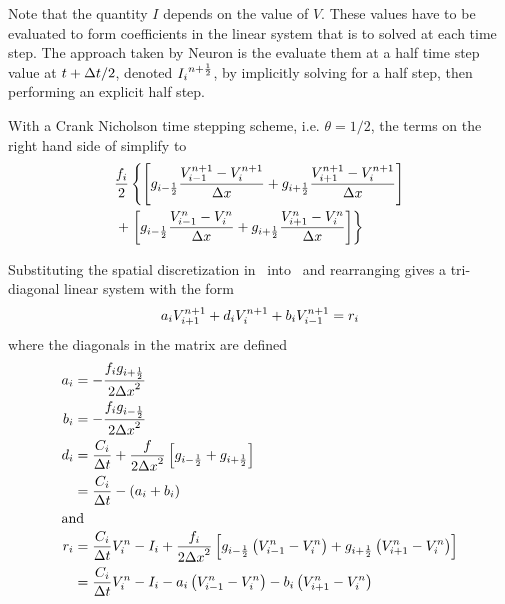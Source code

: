 Note that the quantity $I$ depends on the value of $V$. These values have to be evaluated to form coefficients in the linear system that is to solved at each time step. The approach taken by Neuron is the evaluate them at a half time step value at $t+{\Delta t}/2$, denoted ${{I}_{i}}^{n+\frac{1}{2}}$, by implicitly solving for a half step, then performing an explicit half step.

With a Crank Nicholson time stepping scheme, i.e. $\theta=1/2$, the terms on the right hand side of  simplify to
\begin{align}
        \frac{{f}_{i}}{2}
        &\left\{
            \left[
                {g}_{i-\frac{1}{2}} \frac{{V}_{i-1}^{n+1}-{V}_{i}^{n+1}}{{\Delta x}}
              + {g}_{i+\frac{1}{2}}  \frac{{V}_{i+1}^{n+1}-{V}_{i}^{n+1}}{{\Delta x}}
            \right]
        \right. \nonumber \\
        +
        &\left.
            \left[
                {g}_{i-\frac{1}{2}} \frac{{V}_{i-1}^{n}-{V}_{i}^{n}}{{\Delta x}}
              + {g}_{i+\frac{1}{2}}  \frac{{V}_{i+1}^{n}-{V}_{i}^{n}}{{\Delta x}}
            \right]
        \right\} \label{eq:crankNichRHS}
\end{align}

Substituting the spatial discretization in~ into~ and rearranging gives a tri-diagonal linear system with the form
\begin{equation}
    {a}_{i} {V}_{i+1}^{n+1} + {d}_{i} {V}_{i}^{n+1} + {b}_{i} {V}_{i-1}^{n+1} = {r}_{i}
\end{equation}
where the diagonals in the matrix are defined
\begin{align}
    {a}_{i}  &=  -\frac{{f}_{i}{g}_{i+\frac{1}{2}}}{2{\Delta x}^2} \\
    {b}_{i}  &=  -\frac{{f}_{i}{g}_{i-\frac{1}{2}}}{2{\Delta x}^2} \\
    {d}_{i}  &=  \frac{{C}_{i}}{{\Delta t}} + \frac{f}{2{\Delta x}^2}\left[{g}_{i-\frac{1}{2}}+{g}_{i+\frac{1}{2}}\right] \nonumber\\
            &=  \frac{{C}_{i}}{{\Delta t}} - ( {a}_{i} + {b}_{i} ) \\
\intertext{and}
    {r}_{i}  &=  \frac{{C}_{i}}{{\Delta t}} {V}_{i}^n - {I}_{i} + \frac{{f}_{i}}{2{\Delta x}^2}
                    \left[
                        {g}_{i-\frac{1}{2}} \left( {V}_{i-1}^{n} - {V}_{i}^{n} \right)
                        +
                        {g}_{i+\frac{1}{2}}  \left( {V}_{i+1}^{n}  - {V}_{i}^{n} \right)
                    \right] \nonumber\\
            &=  \frac{{C}_{i}}{{\Delta t}} {V}_{i}^n
                - {I}_{i}
                - {a}_{i} \left( {V}_{i-1}^{n} - {V}_{i}^{n} \right)
                - {b}_{i} \left( {V}_{i+1}^{n}  - {V}_{i}^{n} \right)
\end{align}

